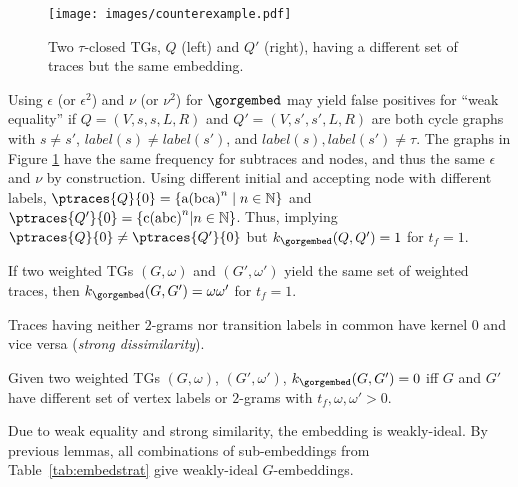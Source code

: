 \begin{figure}[!t]
	\vspace*{-0.5cm}
	\centering
	\texttt{[image: images/counterexample.pdf]}
	\caption{Two $\tau$-closed TGs, $Q$ (left) and $Q'$ (right), having a different set of traces but the same embedding.}\label{fig:counterexample}
\end{figure}
\begin{example}
	Using $\epsilon$ (or $\epsilon^2$) and $\nu$ (or $\nu^2$) for $\gorgembed$ may yield false positives for ``weak equality'' 
	if $Q=(V,s,s,L,R)$ and $Q'=(V,s',s',L,R)$ are both cycle graphs with $s\neq s'$, $\textit{label}(s)\neq\textit{label}(s')$, and
	$\textit{label}(s),\textit{label}(s')\neq\tau$. The graphs in Figure \ref{fig:counterexample} have the 
	same frequency for subtraces and nodes, and thus the same  $\epsilon$ and $\nu$ by construction. Using different 
	initial and accepting node with  different labels, $\ptraces{Q}{0}=\{\textup{a(bca)}^n\mid n\in\mathbb{N}\}$ and 
	$\ptraces{Q'}{0}=\{\textup{c(abc)}^n|n\in\mathbb{N}\}$. Thus, implying $\ptraces{Q}{0}\neq\ptraces{Q'}{0}$ but 
	$k_{\gorgembed}(Q,Q')=1$ for $t_f=1$.
\end{example}

\begin{lemma}
	\label{we}
	If two weighted TGs $(G,\omega)$ and $(G',\omega')$ yield the same set of weighted traces, then 
	$k_{\gorgembed}(G,G')=\omega\omega'$ for $t_f=1$.
\end{lemma}

%
Traces having neither $2$-grams nor transition labels in common have kernel $0$ and vice versa (\textit{strong dissimilarity}). 

\begin{lemma}
	\label{lem:sdiss}
	Given two weighted TGs $(G,\omega)$, $(G',\omega')$, $k_{\gorgembed}(G,G')=0$ iff $G$ and $G'$ have different set 
	of vertex labels or $2$-grams with $t_f,\omega,\omega'>0$.
\end{lemma}


%
Due to weak equality and strong similarity, the embedding is weakly-ideal. {By previous lemmas, all combinations of sub-embeddings from Table~\ref{tab:embedstrat} give weakly-ideal $G$-embeddings.} 

